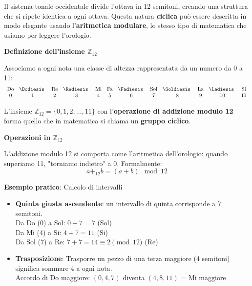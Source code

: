 \begin{matematica}
	\label{math:aritmetica_modulare}
	
	Il sistema tonale occidentale divide l'ottava in 12 semitoni, creando una struttura che si ripete identica a ogni ottava. Questa natura \textbf{ciclica} può essere descritta in modo elegante usando l'\textbf{aritmetica modulare}, lo stesso tipo di matematica che usiamo per leggere l'orologio.
	
	\textbf{Definizione dell'insieme $\mathbb{Z}_{12}$}
	
	Associamo a ogni nota una classe di altezza rappresentata da un numero da 0 a 11:
	\[
	\begin{array}{cccccccccccc}
	\text{Do} & \text{\Dodiesis } & \text{Re} & \text{\Rediesis } & \text{Mi} & \text{Fa} & \text{\Fadiesis } & \text{Sol} & \text{\Soldiesis } & \text{La} & \text{\Ladiesis } & \text{Si} \\
	0 & 1 & 2 & 3 & 4 & 5 & 6 & 7 & 8 & 9 & 10 & 11
	\end{array}
	\]
	
	L'insieme $\mathbb{Z}_{12} = \{0, 1, 2, \ldots, 11\}$ con l'\textbf{operazione di addizione modulo 12} forma quello che in matematica si chiama un \textbf{gruppo ciclico}.
	
	\textbf{Operazioni in $\mathbb{Z}_{12}$}
	
	L'addizione modulo 12 si comporta come l'aritmetica dell'orologio: quando superiamo 11, "torniamo indietro" a 0. Formalmente:
	\[
	a +_{12} b = (a + b) \mod 12
	\]
	
	\textbf{Esempio pratico}: Calcolo di intervalli
	
	\begin{itemize}
		\item \textbf{Quinta giusta ascendente}: un intervallo di quinta corrisponde a 7 semitoni.\\
		Da Do (0) a Sol: $0 + 7 = 7$ (Sol)\\
		Da Mi (4) a Si: $4 + 7 = 11$ (Si)\\
		Da Sol (7) a Re: $7 + 7 = 14 \equiv 2 \pmod{12}$ (Re)
		
		\item \textbf{Trasposizione}: Trasporre un pezzo di una terza maggiore (4 semitoni) significa sommare 4 a ogni nota.\\
		Accordo di Do maggiore: $(0, 4, 7)$ diventa $(4, 8, 11)$ = Mi maggiore
	\end{itemize}
	

\end{matematica}
